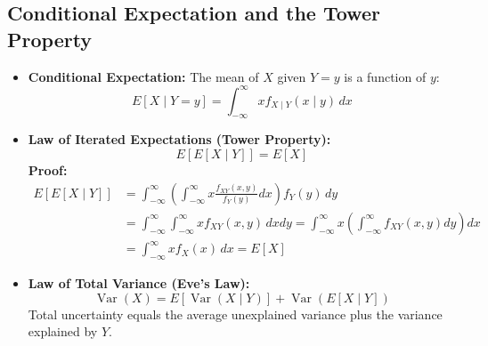 \documentclass[12pt,a4paper]{article}
\begin{document}
\subsection{Conditional Expectation and the Tower Property}
\begin{itemize}[leftmargin=*, itemsep=3pt]
  \item \textbf{Conditional Expectation:} The mean of $X$ given $Y = y$ is a function of $y$:
  \begin{equation}
    E[X \mid Y = y] = \int_{-\infty}^\infty x f_{X \mid Y}(x \mid y) \, dx
  \end{equation}
  \item \textbf{Law of Iterated Expectations (Tower Property):}
  \begin{equation}
    E\left[E[X \mid Y]\right] = E[X]
  \end{equation}
  \textbf{Proof:}
  \begin{align}
    E\left[E[X \mid Y]\right] &= \int_{-\infty}^\infty \left(\int_{-\infty}^\infty x \frac{f_{XY}(x, y)}{f_Y(y)} dx\right) f_Y(y) \, dy \nonumber \\
                              &= \int_{-\infty}^\infty \int_{-\infty}^\infty x f_{XY}(x, y) \, dx dy = \int_{-\infty}^\infty x \left(\int_{-\infty}^\infty f_{XY}(x, y) dy\right) dx \nonumber \\
                              &= \int_{-\infty}^\infty x f_X(x) \, dx = E[X]
  \end{align}
  \item \textbf{Law of Total Variance (Eve's Law):}
  \begin{equation}
    \operatorname{Var}(X) = E[\operatorname{Var}(X \mid Y)] + \operatorname{Var}(E[X \mid Y])
  \end{equation}
  Total uncertainty equals the average unexplained variance plus the variance explained by $Y$.
\end{itemize}
\end{document}

